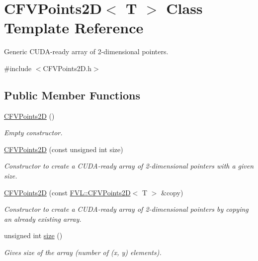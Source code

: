 \hypertarget{classFVL_1_1CFVPoints2D}{
\section{CFVPoints2D$<$ T $>$ Class Template Reference}
\label{d5/dfb/classFVL_1_1CFVPoints2D}
}


Generic CUDA-\/ready array of 2-\/dimensional pointers.  




{\ttfamily \#include $<$CFVPoints2D.h$>$}

\subsection*{Public Member Functions}
\begin{DoxyCompactItemize}
\item 
\hyperlink{classFVL_1_1CFVPoints2D_a3df02bf525a9d5df56cdb835260a9453}{CFVPoints2D} ()
\begin{DoxyCompactList}\small\item\em Empty constructor. \item\end{DoxyCompactList}\item 
\hyperlink{classFVL_1_1CFVPoints2D_a63bf7c15d2279b68774bd55c5813b3e0}{CFVPoints2D} (const unsigned int size)
\begin{DoxyCompactList}\small\item\em Constructor to create a CUDA-\/ready array of 2-\/dimensional pointers with a given size. \item\end{DoxyCompactList}\item 
\hyperlink{classFVL_1_1CFVPoints2D_a89b71fc079d99459852b91dfc2517958}{CFVPoints2D} (const \hyperlink{classFVL_1_1CFVPoints2D}{FVL::CFVPoints2D}$<$ T $>$ \&copy)
\begin{DoxyCompactList}\small\item\em Constructor to create a CUDA-\/ready array of 2-\/dimensional pointers by copying an already existing array. \item\end{DoxyCompactList}\item 
unsigned int \hyperlink{classFVL_1_1CFVPoints2D_a7033bafa80d2349b9b0da59d8c486767}{size} ()
\begin{DoxyCompactList}\small\item\em Gives size of the array (number of (x, y) elements). \item\end{DoxyCompactList}\end{DoxyCompactItemize}
